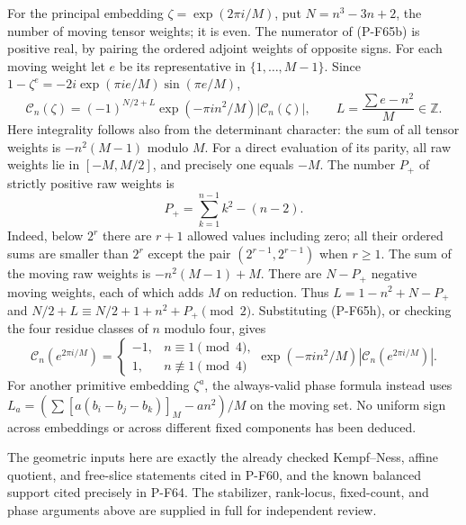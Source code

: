 For the principal embedding $\zeta=\exp(2\pi i/M)$, put
$N=n^3-3n+2$, the number of moving tensor weights; it is even.
The numerator of (P-F65b) is positive real, by pairing the
ordered adjoint weights of opposite signs.  For each moving
weight let $e$ be its representative in $\{1,\ldots,M-1\}$.
Since $1-\zeta^e=-2i\exp(\pi i e/M)\sin(\pi e/M)$,
\[
 \mathcal C_n(\zeta)=(-1)^{N/2+L}
       \exp(-\pi i n^2/M)|\mathcal C_n(\zeta)|,
 \qquad L=\frac{\sum e-n^2}{M}\in\mathbb Z.           \tag{P-F65g}
\]
Here integrality follows also from the determinant character:
the sum of all tensor weights is $-n^2(M-1)$ modulo $M$.
For a direct evaluation of its parity, all raw weights lie
in $[-M,M/2]$, and precisely one equals $-M$.
The number $P_+$ of strictly positive raw weights is
\[
 P_+=\sum_{k=1}^{n-1}k^2-(n-2).                        \tag{P-F65h}
\]
Indeed, below $2^r$ there are $r+1$ allowed values including
zero; all their ordered sums are smaller than $2^r$ except the
pair $(2^{r-1},2^{r-1})$ when $r\ge1$.
The sum of the moving raw weights is $-n^2(M-1)+M$.
There are $N-P_+$ negative moving weights, each of which adds
$M$ on reduction.  Thus
$L=1-n^2+N-P_+$ and
$N/2+L\equiv N/2+1+n^2+P_+\pmod2$.
Substituting (P-F65h), or checking the four residue classes
of $n$ modulo four, gives
\[
 \mathcal C_n(e^{2\pi i/M})=
 \begin{cases}-1,&n\equiv1\pmod4,\\1,&n\not\equiv1\pmod4\end{cases}
 \exp(-\pi i n^2/M)|\mathcal C_n(e^{2\pi i/M})|.        \tag{P-F65i}
\]
For another primitive embedding $\zeta^a$, the always-valid
phase formula instead uses
$L_a=(\sum [a(b_i-b_j-b_k)]_M-a n^2)/M$ on the moving set.
No uniform sign across embeddings or across different fixed
components has been deduced.

The geometric inputs here are exactly the already checked
Kempf--Ness, affine quotient, and free-slice statements cited
in P-F60, and the known balanced support cited precisely in
P-F64.  The stabilizer, rank-locus, fixed-count, and phase
arguments above are supplied in full for independent review.
